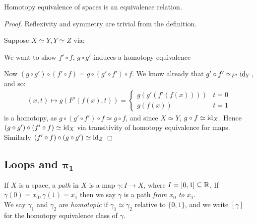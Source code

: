 \documentclass[10pt,a4paper]{article}
\begin{document}
\begin{lemma}
Homotopy equivalence of spaces is an equivalence relation.
\end{lemma}
\begin{proof}
Reflexivity and symmetry are trivial from the definition.

Suppose $X\simeq Y, Y\simeq Z$ via:
\begin{center}
\end{center}
We want to show $f'\circ f$, $g\circ g'$ induces a homotopy equivalence
\begin{center}
\end{center}

Now $(g\circ g') \circ(f'\circ f) = g\circ (g'\circ f')\circ f$. We know already that $g'\circ f' \simeq_{F'} \operatorname{id}_Y$, and so:
\begin{align*}
(x,t) \mapsto g(F'(f(x), t)) = \begin{cases} g(g'(f'(f(x)))) & t=0 \\ g(f(x)) & t =1 \end{cases}
\end{align*}
is a  homotopy, as $g\circ (g'\circ f')\circ f \simeq g\circ f$, and since $X\simeq Y$, $g\circ f \simeq \operatorname{id}_X$. Hence $(g\circ g')\circ (f'\circ f) \simeq \operatorname{id}_X$ via transitivity of homotopy equivalence for maps. Similarly $(f'\circ f)\circ (g\circ g') \simeq \operatorname{id}_Z$
\end{proof}

\subsection*{Loops and $\mathbf{\pi_1}$}
If $X$ is a space, a \emph{path} in $X$ is a map $\gamma:I \rightarrow X$, where $I = [0,1]\subseteq \mathbb{R}$. If $\gamma(0) = x_0, \gamma(1) = x_1$ then we say $\gamma$ is a path \emph{from $x_0$ to $x_1$}.\\
We say $\gamma_1$ and $\gamma_2$ are \emph{homotopic} if $\gamma_1\simeq \gamma_2$ relative to $\{0, 1\}$, and we write $[\gamma]$ for the homotopy equivalence class of $\gamma$.
\end{document}
